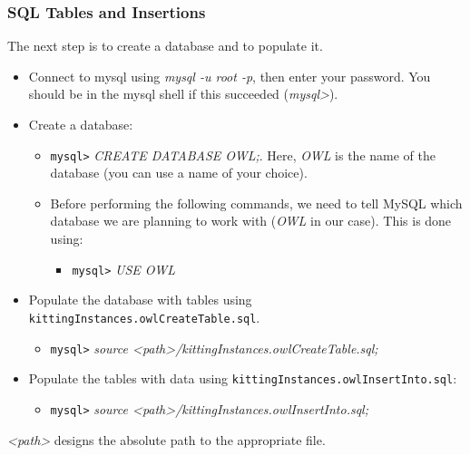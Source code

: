\documentclass[12pt]{article}
\begin{document}
\subsubsection{SQL Tables and Insertions}
The next step is to create a database and to populate it.

\begin{itemize}
\item Connect to mysql using \textit{mysql -u root -p}, then enter your password. You should be in the mysql shell if this succeeded (\textit{mysql>}). 
\item Create a database: 
\begin{itemize}
\item \texttt{mysql>} \textit{CREATE DATABASE OWL;}. Here, \textit{OWL} is the name of the database (you can use a name of your choice).
\item Before performing the following commands, we need to tell MySQL which database we are planning to work with (\textit{OWL} in our case). This is done using:
\begin{itemize}
\item[] \texttt{mysql>} \textit{USE OWL}
\end{itemize} 
\end{itemize} 
\item Populate the database with tables using \texttt{kittingInstances.owlCreateTable.sql}. 
\begin{itemize}
 \item \texttt{mysql>} \textit{source <path>/kittingInstances.owlCreateTable.sql;}
\end{itemize} 
 
\item Populate the tables with data using \texttt{kittingInstances.owlInsertInto.sql}: 
\begin{itemize}
 \item \texttt{mysql>} \textit{source <path>/kittingInstances.owlInsertInto.sql;}
\end{itemize} 
\end{itemize} 

\textit{<path>} designs the absolute path to the appropriate file.
\end{document}
